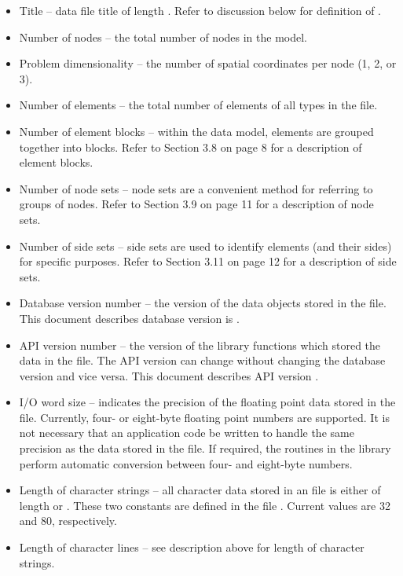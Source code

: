 \begin{itemize}
 \item {Title -- data file title of length}
 . Refer to discussion below for definition
 of .

 \item {Number of nodes -- the total number of nodes in the model.}

 \item {Problem dimensionality -- the number of spatial coordinates
 per node (1, 2, or 3).}

 \item {Number of elements -- the total number of elements of all
 types in the file.}

 \item {Number of element blocks -- within the \exo{} data model,
 elements are grouped together into blocks. Refer to Section 3.8 on
 page 8 for a description of element blocks. }

 \item {Number of node sets -- node sets are a convenient method for
 referring to groups of nodes. Refer to Section 3.9 on page 11 for a
 description of node sets.}

 \item {Number of side sets -- side sets are used to identify elements
 (and their sides) for specific purposes. Refer to Section 3.11 on
 page 12 for a description of side sets.}

 \item Database version number -- the version of the data objects
 stored in the file. This document describes database version is
 \version{}.

 \item API version number -- the version of the \exo{} library
 functions which stored the data in the file. The API version can
 change without changing the database version and vice versa. This
 document describes API version \version{}.

 \item {I/O word size -- indicates the precision of the floating point
 data stored in the file. Currently, four- or eight-byte floating
 point numbers are supported. It is not necessary that an application
 code be written to handle the same precision as the data stored in
 the file. If required, the routines in the \exo{} library perform
 automatic conversion between four- and eight-byte numbers.}

 \item Length of character strings -- all character data stored in an
 \exo{} file is either of length  or
 . These two constants are defined in the
 file . Current values are 32 and
 80, respectively.

 \item Length of character lines -- see description above
for length of character strings.
\end{itemize}


